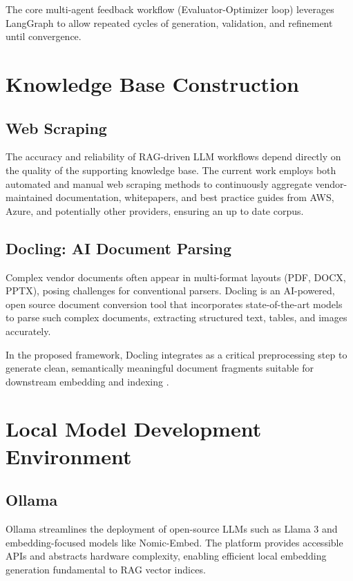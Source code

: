 The core multi-agent feedback workflow (Evaluator-Optimizer loop) leverages LangGraph to allow repeated cycles of generation, validation, and refinement until convergence.

\section{Knowledge Base Construction}

\subsection{Web Scraping}

The accuracy and reliability of RAG-driven LLM workflows depend directly on the quality of the supporting knowledge base. The current work employs both automated and manual web scraping methods to continuously aggregate vendor-maintained documentation, whitepapers, and best practice guides from AWS, Azure, and potentially other providers, ensuring an up to date corpus.

\subsection{Docling: AI Document Parsing}

Complex vendor documents often appear in multi-format layouts (PDF, DOCX, PPTX), posing challenges for conventional parsers. Docling \cite{docling2025paper} is an AI-powered, open source document conversion tool that incorporates state-of-the-art models to parse such complex documents, extracting structured text, tables, and images accurately.

In the proposed framework, Docling integrates as a critical preprocessing step to generate clean, semantically meaningful document fragments suitable for downstream embedding and indexing \cite{docling2024web}.

\section{Local Model Development Environment}

\subsection{Ollama}

Ollama \cite{ollama2024web} streamlines the deployment of open-source LLMs such as Llama 3 and embedding-focused models like Nomic-Embed. The platform provides accessible APIs and abstracts hardware complexity, enabling efficient local embedding generation fundamental to RAG vector indices.

